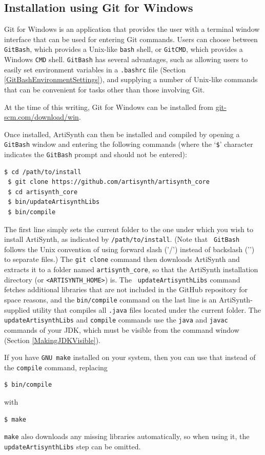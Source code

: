 \ifWindows
\subsection{Installation using Git for Windows}
\label{GitForWindows}

Git for Windows is an application that provides the user with a
terminal window interface that can be used for entering Git commands.
Users can choose between {\tt GitBash}, which provides a Unix-like
{\tt bash} shell, or {\tt GitCMD}, which provides a Windows {\tt CMD}
shell. {\tt GitBash} has several advantages, such as allowing users
to easily set environment variables in a {\tt .bashrc} file
(Section \ref{GitBashEnvironmentSettings}), and supplying a number of
Unix-like commands that can be convenient for tasks other than those
involving Git.

At the time of this writing, Git for Windows can be installed from
\href{https://git-scm.com/download/win}{git-scm.com/download/win}.

Once installed, ArtiSynth can then be installed and compiled by
opening a {\tt GitBash} window and entering the following commands
(where the `{\tt \$}' character indicates the {\tt GitBash} prompt
and should not be entered):
%
\begin{lstlisting}[]
 $ cd /path/to/install
 $ git clone https://github.com/artisynth/artisynth_core
 $ cd artisynth_core
 $ bin/updateArtisynthLibs
 $ bin/compile
\end{lstlisting}
%
The first line simply sets the current folder to the one under which you wish
to install ArtiSynth, as indicated by {\tt /path/to/install}.  (Note that {\tt
GitBash} follows the Unix convention of using forward slash ('/') instead of
backslash ('\BKS ') to separate files.)  The {\tt git clone} command then
downloads ArtiSynth and extracts it to a folder named {\tt artisynth\_core}, so
that the ArtiSynth installation directory (or {\tt <ARTISYNTH\_HOME>})
is. The {\tt
updateArtisynthLibs} command fetches additional libraries that are not included
in the GitHub repository for space reasons, and the {\tt bin/compile} command
on the last line is an ArtiSynth-supplied utility that compiles all {\tt .java}
files located under the current folder. The {\tt updateArtisynthLibs} and
{\tt compile} commands use the {\tt java} and {\tt javac} commands of your
JDK, which must be visible from the command window
(Section \ref{MakingJDKVisible}).

If you have {\tt GNU make} installed on your system, then you can use that
instead of the {\tt compile} command, replacing
%
\begin{lstlisting}[]
 $ bin/compile
\end{lstlisting}
%
with
%
\begin{lstlisting}[]
 $ make
\end{lstlisting}
%
{\tt make} also downloads any missing libraries automatically, so when
using it, the {\tt updateArtisynthLibs} step can be omitted.

